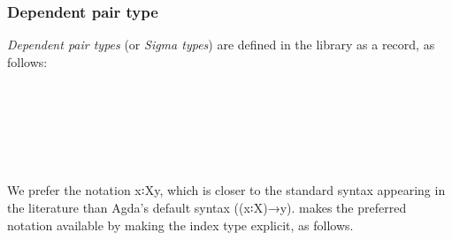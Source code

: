 \subsubsection{Dependent pair type}\label{Preliminaries.sssec:dependent-pair-type}
\textit{Dependent pair types} (or \textit{Sigma types}) are defined in the \typetopology library as a record, as follows:
\ccpad
\begin{code}
\>[0]\AgdaSpace{}%
\AgdaSpace{}%
\AgdaSymbol{\{}\AgdaSpace{}%
\AgdaSymbol{\}}\AgdaSpace{}%
\AgdaSymbol{\{}\AgdaSpace{}%
\AgdaSymbol{:}\AgdaSpace{}%
\AgdaSpace{}%
\AgdaSpace{}%
\AgdaSymbol{\}}\AgdaSpace{}%
\AgdaSymbol{(}\AgdaSpace{}%
\AgdaSymbol{:}\AgdaSpace{}%
\AgdaSpace{}%
\AgdaSpace{}%
\AgdaSpace{}%
\AgdaSpace{}%
\AgdaSymbol{)}\AgdaSpace{}%
\AgdaSymbol{:}\AgdaSpace{}%
\AgdaSpace{}%
\AgdaSpace{}%
\AgdaSpace{}%
%
\>[52]\<%
\\
\>[0][@{}l@{\AgdaIndent{0}}]%
\>[2]\AgdaSpace%
\AgdaOperator{\AgdaInductiveConstructor{\AgdaUnderscore{},\AgdaUnderscore{}}}\<%
\\
%
\>[2]\<%
\\
\>[2][@{}l@{\AgdaIndent{0}}]%
\>[3]\AgdaSpace{}%
\AgdaSymbol{:}\AgdaSpace{}%
\<%
\\
%
\>[3]\AgdaSpace{}%
\AgdaSymbol{:}\AgdaSpace{}%
\AgdaSpace{}%
\<%
\\
%
\>[0]\AgdaSpace{}%
\AgdaSpace{}%
\AgdaOperator{\AgdaInductiveConstructor{\AgdaUnderscore{},\AgdaUnderscore{}}}\<%
\end{code}
\ccpad
We prefer the notation \ab x꞉\ab X\AgdaComma{}y, which is closer to the standard syntax appearing in the literature than Agda's default syntax ((\ab x꞉\ab X)\as →\ab y). \mhe makes the preferred notation available by making the index type explicit, as follows.
\ccpad
